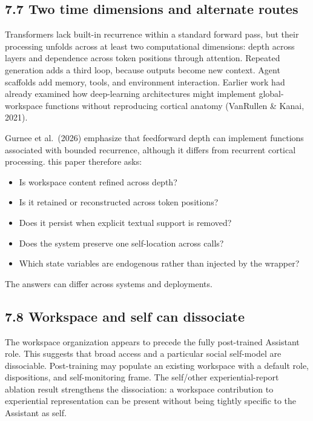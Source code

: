 \documentclass[
  11pt,
]{article}
\providecommand{\tightlist}{%
  \setlength{\itemsep}{0pt}\setlength{\parskip}{0pt}}
\begin{document}
\subsection{7.7 Two time dimensions and alternate
routes}\label{two-time-dimensions-and-alternate-routes}

Transformers lack built-in recurrence within a standard forward pass,
but their processing unfolds across at least two computational
dimensions: depth across layers and dependence across token positions
through attention. Repeated generation adds a third loop, because
outputs become new context. Agent scaffolds add memory, tools, and
environment interaction. Earlier work had already examined how
deep-learning architectures might implement global-workspace functions
without reproducing cortical anatomy (VanRullen \& Kanai, 2021).

Gurnee et al.~(2026) emphasize that feedforward depth can implement
functions associated with bounded recurrence, although it differs from
recurrent cortical processing. this paper therefore asks:

\begin{itemize}
\tightlist
\item
  Is workspace content refined across depth?
\item
  Is it retained or reconstructed across token positions?
\item
  Does it persist when explicit textual support is removed?
\item
  Does the system preserve one self-location across calls?
\item
  Which state variables are endogenous rather than injected by the
  wrapper?
\end{itemize}

The answers can differ across systems and deployments.

\subsection{7.8 Workspace and self can
dissociate}\label{workspace-and-self-can-dissociate}

The workspace organization appears to precede the fully post-trained
Assistant role. This suggests that broad access and a particular social
self-model are dissociable. Post-training may populate an existing
workspace with a default role, dispositions, and self-monitoring frame.
The self/other experiential-report ablation result strengthens the
dissociation: a workspace contribution to experiential representation
can be present without being tightly specific to the Assistant as self.
\end{document}
